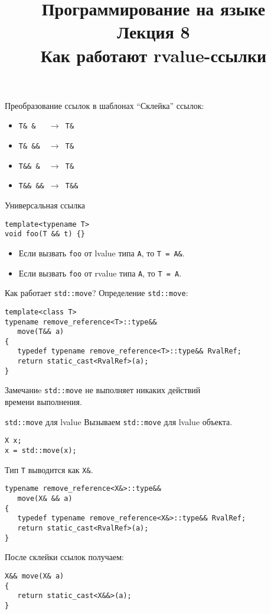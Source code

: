 \documentclass[aspectration=1610,t]{beamer}
\title{{\bf Программирование на языке \langcpp\protect\\Лекция
8\protect\vspace{1em}\\}Как работают rvalue-ссылки}
\begin{document}
\begin{frame} 
  \titlepage
\end{frame}

\begin{frame}[fragile]{Преобразование ссылок в шаблонах}
    ``Склейка'' ссылок:
    \begin{itemize}
    \item \texttt{T\& \&\ \ \ $\to$ T\&}
    \item \texttt{T\& \&\&\ \  $\to$ T\&}
    \item \texttt{T\&\& \&\ \  $\to$ T\&}
    \item \texttt{T\&\& \&\&\  $\to$ T\&\&}
    \end{itemize}

\begin{block}{Универсальная ссылка}
\begin{lstlisting}
template<typename T>
void foo(T && t) {}
\end{lstlisting}
\begin{itemize}
    \item Если вызвать {\tt foo} от lvalue типа {\tt A}, то {\tt T = A\&}.
    \item Если вызвать {\tt foo} от rvalue типа {\tt A}, то {\tt T = A}.
\end{itemize}
\end{block}
\end{frame}

\begin{frame}[fragile]{Как работает {\tt std::move}?}
Определение \texttt{std::move}:
\begin{lstlisting}
template<class T> 
typename remove_reference<T>::type&&
   move(T&& a) 
{
   typedef typename remove_reference<T>::type&& RvalRef;
   return static_cast<RvalRef>(a);
}  
    \end{lstlisting}


\begin{block}{Замечаниe}
    \texttt{std::move} не выполняет никаких действий\\
    времени выполнения.
\end{block}
\end{frame}

\begin{frame}[fragile]{{\tt std::move} для lvalue}
Вызываем \texttt{std::move} для lvalue объекта.
\begin{lstlisting}
X x;
x = std::move(x);
\end{lstlisting}
Тип \texttt{T} выводится как \texttt{X\&}.
    \begin{lstlisting}
typename remove_reference<X&>::type&&
   move(X& && a) 
{
   typedef typename remove_reference<X&>::type&& RvalRef;
   return static_cast<RvalRef>(a);
} 
    \end{lstlisting}
После склейки ссылок получаем:
    \begin{lstlisting}
X&& move(X& a) 
{
   return static_cast<X&&>(a);
} 
    \end{lstlisting}
\end{frame}
\end{document}
